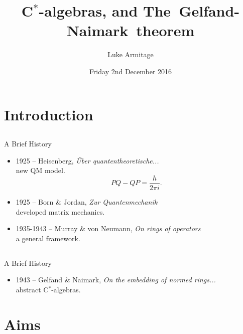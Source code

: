 \documentclass{beamer}
\title[Hypergraphs]
{C$^\ast$-algebras, and The~Gelfand-Naimark~theorem}
\author[L. Armitage] 
{Luke Armitage}
\date{Friday 2nd December 2016}
\begin{document}
\begin{frame}
  	\titlepage
\end{frame}


\section{Introduction}
\subsection{}
\begin{frame}{A Brief History}{}
 \begin{itemize}
	\item 1925 -- Heisenberg, 					
		\emph{\"{U}ber quantentheoretische...}\\
		 new QM model.						
		\[PQ-QP= \frac{h} {2 \pi i}.\]			
											
	\item 1925 -- Born \& Jordan,
		\emph{Zur Quantenmechanik}\\			
		 developed matrix mechanics.		
			
	\item 1935-1943 -- Murray \& von Neumann,
		\emph{On rings of operators}\\			
		 a general framework. 					
 \end{itemize}
\end{frame}

\subsection{}
\begin{frame}{A Brief History}{}
 \begin{itemize}
  	\item 1943 -- Gelfand \& Naimark,
  		\emph{On the embedding of normed rings...}\\  
  		 abstract C$^\ast$-algebras. 				  
  		
 \end{itemize}
\end{frame}


\section{Aims}
\end{document}
